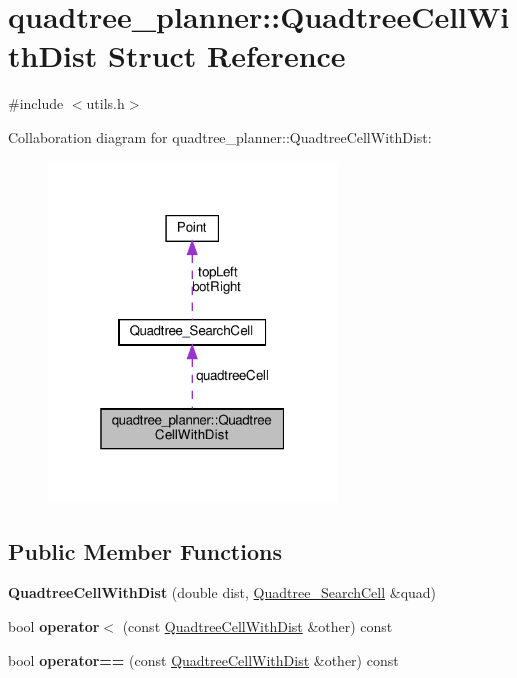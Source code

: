 \hypertarget{structquadtree__planner_1_1QuadtreeCellWithDist}{}\section{quadtree\+\_\+planner\+:\+:Quadtree\+Cell\+With\+Dist Struct Reference}
\label{structquadtree__planner_1_1QuadtreeCellWithDist}


{\ttfamily \#include $<$utils.\+h$>$}



Collaboration diagram for quadtree\+\_\+planner\+:\+:Quadtree\+Cell\+With\+Dist\+:\nopagebreak
\begin{figure}[H]
\begin{center}
\leavevmode
\includegraphics[width=217pt]{structquadtree__planner_1_1QuadtreeCellWithDist__coll__graph}
\end{center}
\end{figure}
\subsection*{Public Member Functions}
\begin{DoxyCompactItemize}
\item 
\mbox{\label{structquadtree__planner_1_1QuadtreeCellWithDist_a9cb3e694743f7fbd8aa3cce7bc1922f7}} 
{\bfseries Quadtree\+Cell\+With\+Dist} (double dist, \hyperlink{classQuadtree__SearchCell}{Quadtree\+\_\+\+Search\+Cell} \&quad)
\item 
\mbox{\label{structquadtree__planner_1_1QuadtreeCellWithDist_a16c9b514ab8a8413b406a2dd36d2fa6c}} 
bool {\bfseries operator$<$} (const \hyperlink{structquadtree__planner_1_1QuadtreeCellWithDist}{Quadtree\+Cell\+With\+Dist} \&other) const
\item 
\mbox{\label{structquadtree__planner_1_1QuadtreeCellWithDist_a554863dd5ddc8549717eb362f7de96f2}} 
bool {\bfseries operator==} (const \hyperlink{structquadtree__planner_1_1QuadtreeCellWithDist}{Quadtree\+Cell\+With\+Dist} \&other) const
\end{DoxyCompactItemize}
